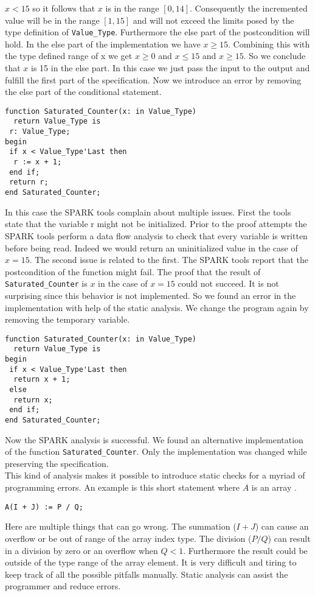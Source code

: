 $x < 15$ so it follows that $x$ is in the range $[0, 14]$. Consequently the 
incremented value will be in the range $[1, 15]$ and will not exceed the
limits posed by the type definition of \verb"Value_Type". Furthermore the 
else part of the postcondition will hold. In the else part of the 
implementation we have $x \geq 15$. Combining this with the type defined
range of x we get $x \geq 0$ and $x \leq 15$ and $x \geq 15$. So we conclude that $x$
is 15 in the else part. In this case we just pass the input to the output
and fulfill the first part of the specification.
Now we introduce an error by removing the else part of the conditional
statement.
\begin{lstlisting}
function Saturated_Counter(x: in Value_Type)
  return Value_Type is
 r: Value_Type;
begin
 if x < Value_Type'Last then
  r := x + 1;
 end if;
 return r;
end Saturated_Counter;
\end{lstlisting}
In this case the SPARK tools complain about multiple issues. First the
tools state that the variable r might not be initialized. Prior to the
proof attempts the SPARK tools perform a data flow analysis to check that
every variable is written before being read. Indeed we would return an
uninitialized value in the case of $x = 15$. The second issue is related
to the first. The SPARK tools report that the postcondition of the function
might fail. The proof that the result of \verb"Saturated_Counter" is $x$ in the case
of $x = 15$ could not succeed. It is not surprising since this behavior
is not implemented. So we found an error in the implementation with help
of the static analysis.
We change the program again by removing the temporary variable.
\begin{lstlisting}
function Saturated_Counter(x: in Value_Type)
  return Value_Type is
begin
 if x < Value_Type'Last then
  return x + 1;
 else
  return x;
 end if;
end Saturated_Counter;
\end{lstlisting}
Now the SPARK analysis is successful. We found an alternative 
implementation of the function \verb"Saturated_Counter". Only the implementation
was changed while preserving the specification. \\
This kind of analysis makes it possible to introduce static checks for
a myriad of programming errors. An example is this short statement
where $A$ is an array \cite{sweb}.
\begin{lstlisting}
A(I + J) := P / Q;
\end{lstlisting}
Here are multiple things that can go wrong. The summation ($I + J$) can 
cause an overflow or be out of range of the array index type. The division
($P / Q$) can result in a division by zero or an overflow when $Q < 1$. 
Furthermore the result could be outside of the type range of 
the array element. It is very difficult and tiring to keep track of all
the possible pitfalls manually. Static analysis can assist the programmer
and reduce errors.